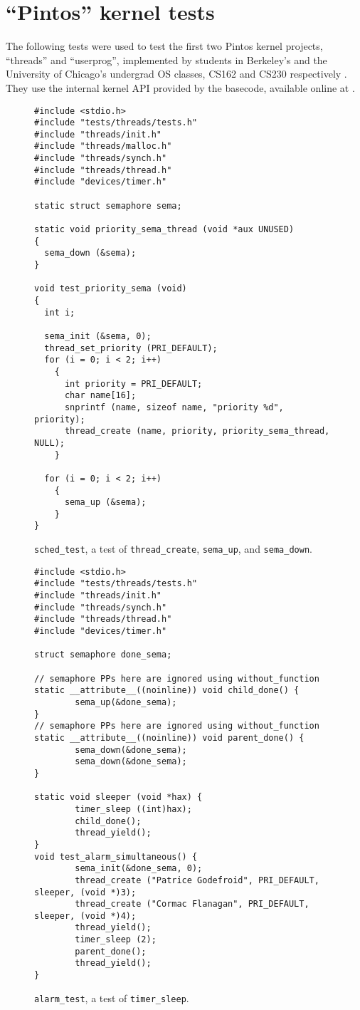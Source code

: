\documentclass[pldi]{../sigplanconf-pldi15}
\begin{document}
\section{``Pintos'' kernel tests}

The following tests were used to test the first two Pintos kernel projects, ``threads'' and ``userprog'',
implemented by students in Berkeley's and the University of Chicago's undergrad OS classes,
CS162 and CS230 respectively \cite{pintos}.
They use the internal kernel API provided by the basecode, available online at \cite{pintos-github}.

\begin{figure*}
\begin{verbatim}
#include <stdio.h>
#include "tests/threads/tests.h"
#include "threads/init.h"
#include "threads/malloc.h"
#include "threads/synch.h"
#include "threads/thread.h"
#include "devices/timer.h"

static struct semaphore sema;

static void priority_sema_thread (void *aux UNUSED) 
{
  sema_down (&sema);
}

void test_priority_sema (void) 
{
  int i;

  sema_init (&sema, 0); 
  thread_set_priority (PRI_DEFAULT);
  for (i = 0; i < 2; i++)
    {   
      int priority = PRI_DEFAULT;
      char name[16];
      snprintf (name, sizeof name, "priority %d", priority);
      thread_create (name, priority, priority_sema_thread, NULL);
    }   

  for (i = 0; i < 2; i++)
    {   
      sema_up (&sema);
    }   
}
\end{verbatim}
	\caption{{\tt sched\_test},
	a test of {\tt thread\_create}, {\tt sema\_up}, and {\tt sema\_down}.}
	\label{fig:prisema}
\end{figure*}
\begin{figure*}
\begin{verbatim}
#include <stdio.h>
#include "tests/threads/tests.h"
#include "threads/init.h"
#include "threads/synch.h"
#include "threads/thread.h"
#include "devices/timer.h"

struct semaphore done_sema;

// semaphore PPs here are ignored using without_function
static __attribute__((noinline)) void child_done() {
        sema_up(&done_sema);
}
// semaphore PPs here are ignored using without_function
static __attribute__((noinline)) void parent_done() {
        sema_down(&done_sema);
        sema_down(&done_sema);
}

static void sleeper (void *hax) {
        timer_sleep ((int)hax);
        child_done();
        thread_yield();
}
void test_alarm_simultaneous() {
        sema_init(&done_sema, 0); 
        thread_create ("Patrice Godefroid", PRI_DEFAULT, sleeper, (void *)3);
        thread_create ("Cormac Flanagan", PRI_DEFAULT, sleeper, (void *)4);
        thread_yield();
        timer_sleep (2);
        parent_done();
        thread_yield();
}
\end{verbatim}
	\caption{{\tt alarm\_test},
	a test of {\tt timer\_sleep}.}
	\label{fig:alarm}
\end{figure*}
\end{document}
